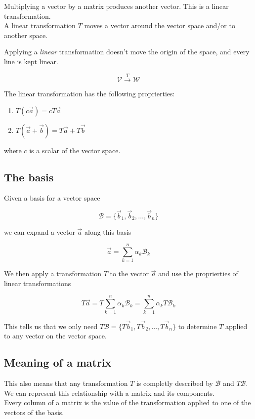 \documentclass{article}
\begin{document}
Multiplying a vector by a matrix produces another vector. This is a linear transformation. \\
A linear transformation \(T\) moves a vector around the vector space and/or to another space.

Applying a \textit{linear} transformation doesn't move the origin of the space, and every line
is kept linear.

\[
    \mathcal{V} \xrightarrow{T} \mathcal{W}
\]

The linear transformation has the following proprierties:

\begin{enumerate}
    \item \(T(c\vec{a})=cT\vec{a}\)
    \item \(T(\vec{a} + \vec{b}) = T\vec{a} + T\vec{b}\)
\end{enumerate}

where \(c\) is a scalar of the vector space.

\subsection{The basis}

Given a basis for a vector space

\[
    \mathcal{B}=\{\vec{b}_1, \vec{b}_2, \ldots, \vec{b}_n\}
\]

we can expand a vector \(\vec{a}\) along this basis

\[
    \vec{a} = \sum_{k=1}^{n} \alpha_k \mathcal{B}_k
\]

We then apply a transformation \(T\) to the vector \(\vec{a}\) and use the proprierties of linear transformations

\[
    T\vec{a}
    = T\sum_{k=1}^{n} \alpha_k \mathcal{B}_k
    = \sum_{k=1}^{n} \alpha_k T\mathcal{B}_k
\]

This tells us that we only need \(T\mathcal{B}=\{T\vec{b}_1, T\vec{b}_2, \ldots, T\vec{b}_n\}\)
to determine \(T\) applied to any vector on the vector space.

\subsection{Meaning of a matrix}

This also means that any transformation \(T\) is completly described by \(\mathcal{B}\)
and \(T\mathcal{B}\). We can represent this relationship with a matrix and its components. \\
Every column of a matrix is the value of the transformation applied to one of the vectors of the basis.
\end{document}
